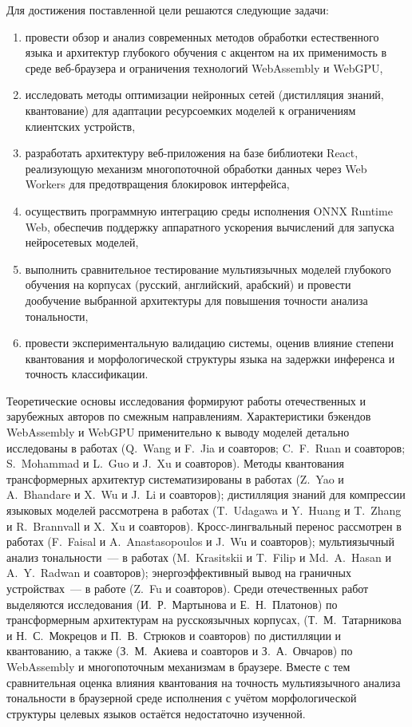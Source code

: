 Для достижения поставленной цели решаются следующие задачи:

\begin{enumerate}
    \item провести обзор и анализ современных методов обработки естественного языка и архитектур глубокого обучения с акцентом на их применимость в среде веб-браузера и ограничения технологий WebAssembly и WebGPU,
    \item исследовать методы оптимизации нейронных сетей (дистилляция знаний, квантование) для адаптации ресурсоемких моделей к ограничениям клиентских устройств,
    \item разработать архитектуру веб-приложения на базе библиотеки React, реализующую механизм многопоточной обработки данных через Web Workers для предотвращения блокировок интерфейса,
    \item осуществить программную интеграцию среды исполнения ONNX Runtime Web, обеспечив поддержку аппаратного ускорения вычислений для запуска нейросетевых моделей,
    \item выполнить сравнительное тестирование мультиязычных моделей глубокого обучения на корпусах (русский, английский, арабский) и провести дообучение выбранной архитектуры для повышения точности анализа тональности,
    \item провести экспериментальную валидацию системы, оценив влияние степени квантования и морфологической структуры языка на задержки инференса и точность классификации.
\end{enumerate}

Теоретические основы исследования формируют работы отечественных и зарубежных авторов по смежным направлениям. Характеристики бэкендов WebAssembly и WebGPU применительно к выводу моделей детально исследованы в работах (Q.~Wang и F.~Jia и соавторов; C.~F.~Ruan и соавторов; S.~Mohammad и L.~Guo и J.~Xu и соавторов). Методы квантования трансформерных архитектур систематизированы в работах (Z.~Yao и A.~Bhandare и X.~Wu и J.~Li и соавторов); дистилляция знаний для компрессии языковых моделей рассмотрена в работах (T.~Udagawa и Y.~Huang и T.~Zhang и R.~Brannvall и X.~Xu и соавторов). Кросс-лингвальный перенос рассмотрен в работах (F.~Faisal и A.~Anastasopoulos и J.~Wu и соавторов); мультиязычный анализ тональности~--- в работах (M.~Krasitskii и T.~Filip и Md.~A.~Hasan и A.~Y.~Radwan и соавторов); энергоэффективный вывод на граничных устройствах~--- в работе (Z.~Fu и соавторов). Среди отечественных работ выделяются исследования (И.~Р.~Мартынова и Е.~Н.~Платонов) по трансформерным архитектурам на русскоязычных корпусах, (Т.~М.~Татарникова и Н.~С.~Мокрецов и П.~В.~Стрюков и соавторов) по дистилляции и квантованию, а также (З.~М.~Акиева и соавторов и З.~А.~Овчаров) по WebAssembly и многопоточным механизмам в браузере. Вместе с тем сравнительная оценка влияния квантования на точность мультиязычного анализа тональности в браузерной среде исполнения с учётом морфологической структуры целевых языков остаётся недостаточно изученной.

